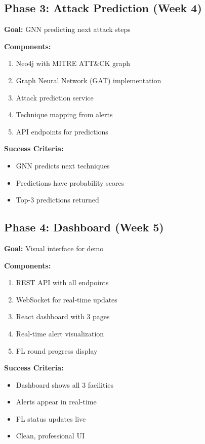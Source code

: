 \documentclass[12pt,a4paper]{article}
\begin{document}
\subsection{Phase 3: Attack Prediction (Week 4)}

\textbf{Goal:} GNN predicting next attack steps

\textbf{Components:}
\begin{enumerate}[leftmargin=1cm,itemsep=0pt]
    \item Neo4j with MITRE ATT\&CK graph
    \item Graph Neural Network (GAT) implementation
    \item Attack prediction service
    \item Technique mapping from alerts
    \item API endpoints for predictions
\end{enumerate}

\textbf{Success Criteria:}
\begin{itemize}[leftmargin=1cm,itemsep=0pt]
    \item GNN predicts next techniques
    \item Predictions have probability scores
    \item Top-3 predictions returned
\end{itemize}

\subsection{Phase 4: Dashboard (Week 5)}

\textbf{Goal:} Visual interface for demo

\textbf{Components:}
\begin{enumerate}[leftmargin=1cm,itemsep=0pt]
    \item REST API with all endpoints
    \item WebSocket for real-time updates
    \item React dashboard with 3 pages
    \item Real-time alert visualization
    \item FL round progress display
\end{enumerate}

\textbf{Success Criteria:}
\begin{itemize}[leftmargin=1cm,itemsep=0pt]
    \item Dashboard shows all 3 facilities
    \item Alerts appear in real-time
    \item FL status updates live
    \item Clean, professional UI
\end{itemize}
\end{document}
